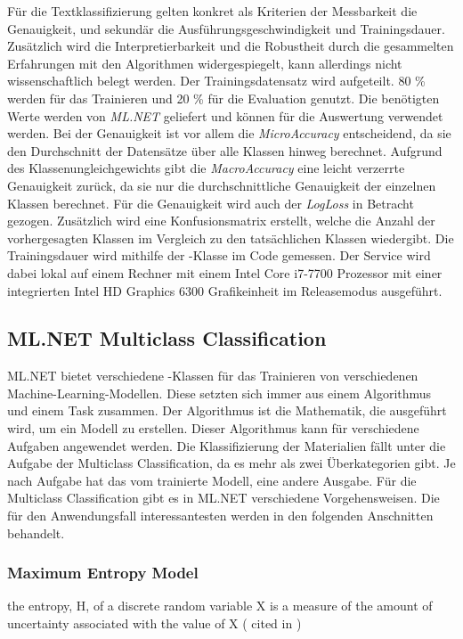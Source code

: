 Für die Textklassifizierung gelten konkret als Kriterien der Messbarkeit die Genauigkeit, und sekundär die Ausführungsgeschwindigkeit und Trainingsdauer. Zusätzlich wird die Interpretierbarkeit und die Robustheit durch die gesammelten Erfahrungen mit den Algorithmen widergespiegelt, kann allerdings nicht wissenschaftlich belegt werden.
Der Trainingsdatensatz wird aufgeteilt. 80 \% werden für das Trainieren und 20 \% für die Evaluation genutzt. Die benötigten Werte werden von \textit{ML.NET} geliefert und können für die Auswertung verwendet werden. Bei der Genauigkeit ist vor allem die \textit{MicroAccuracy} entscheidend, da sie den Durchschnitt der Datensätze über alle Klassen hinweg berechnet. Aufgrund des Klassenungleichgewichts gibt die \textit{MacroAccuracy} eine leicht verzerrte Genauigkeit zurück, da sie nur die durchschnittliche Genauigkeit der einzelnen Klassen berechnet. Für die Genauigkeit wird auch der \textit{LogLoss} in Betracht gezogen. Zusätzlich wird eine Konfusionsmatrix erstellt, welche die Anzahl der vorhergesagten Klassen im Vergleich zu den tatsächlichen Klassen wiedergibt. \citep[vgl.][]{metrics_doc}
Die Trainingsdauer wird mithilfe der -Klasse im Code gemessen. Der Service wird dabei lokal auf einem Rechner mit einem Intel Core i7-7700 Prozessor mit einer integrierten Intel HD Graphics 6300 Grafikeinheit im Releasemodus ausgeführt.

\subsection{ML.NET Multiclass Classification}
\label{c:conception:classification:multiclass}
ML.NET bietet verschiedene -Klassen für das Trainieren von verschiedenen Machine-Learning-Modellen. Diese setzten sich immer aus einem Algorithmus und einem \glqq Task\grqq{} zusammen. Der Algorithmus ist die Mathematik, die ausgeführt wird, um ein Modell zu erstellen. Dieser Algorithmus kann für verschiedene Aufgaben angewendet werden. Die Klassifizierung der Materialien fällt unter die Aufgabe der Multiclass Classification, da es mehr als zwei Überkategorien gibt. Je nach Aufgabe hat das vom  trainierte Modell, eine andere Ausgabe. \citep[vgl.][]{select_ml_2021}
Für die Multiclass Classification gibt es in ML.NET verschiedene Vorgehensweisen. Die für den Anwendungsfall interessantesten werden in den folgenden Anschnitten behandelt.

\subsubsection{Maximum Entropy Model}
\begin{definition}[Entropie]
	\label{def:entorpy}
	\glqq the entropy, H, of a discrete random variable X is a measure of the amount of uncertainty associated with the value of X \grqq{} (\cite{shannon1948} cited in \cite{sep-information})
\end{definition}

